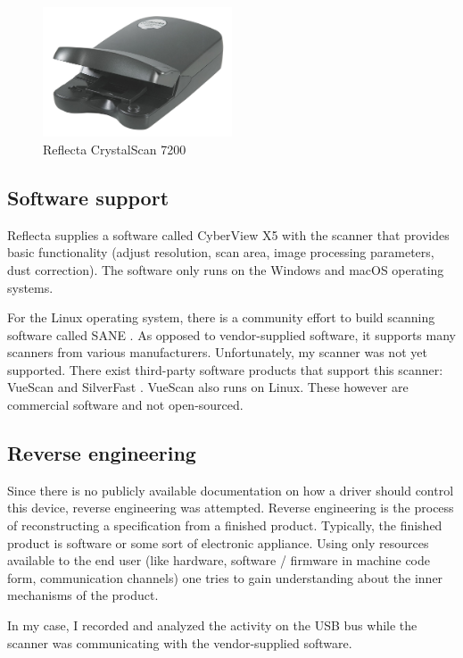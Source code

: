 \documentclass{article}
\begin{document}
\begin{figure}[!htbp]
  \caption{Reflecta CrystalScan 7200}
  \centering
  \includegraphics[width=0.5\textwidth]{images/presentation/the_scanner.jpg}
\end{figure}

\subsection{Software support}

Reflecta supplies a software called CyberView X5 with the scanner that
provides basic functionality (adjust resolution, scan area, image processing parameters, dust correction).
The software only runs on the Windows and macOS operating systems.

For the Linux operating system, there is a community effort to build scanning software
called SANE \cite{saneproject}. As opposed to vendor-supplied software, it supports many scanners
from various manufacturers. Unfortunately, my scanner was not yet supported.
There exist third-party software products that support this scanner: VueScan \cite{vuescan}
and SilverFast \cite{silverfast}. VueScan also runs on Linux. These however are commercial software
and not open-sourced.

\subsection{Reverse engineering}

Since there is no publicly available documentation on how a driver should control this
device, reverse engineering was attempted.
Reverse engineering is the process of reconstructing a specification from a finished
product. Typically, the finished product is software or some sort of electronic
appliance.
Using only resources available to the end user (like hardware,
software / firmware in machine code form, communication channels)
one tries to gain understanding about the inner mechanisms of the product.

In my case, I recorded and analyzed the activity on the USB bus while the scanner
was communicating with the vendor-supplied software.
\end{document}
